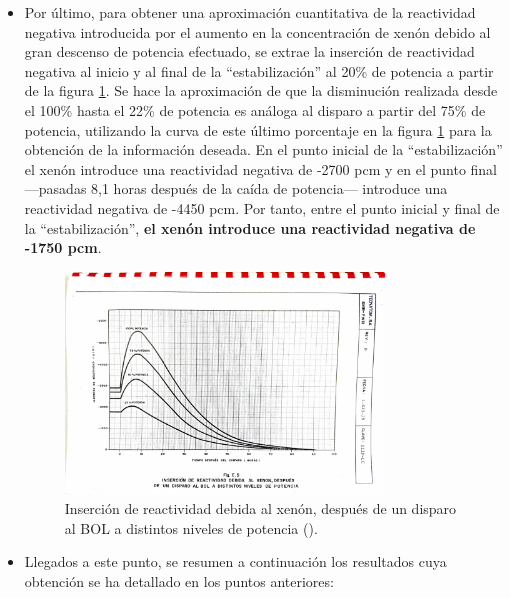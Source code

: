 \begin{itemize}
  \item Por último, para obtener una aproximación cuantitativa de la reactividad negativa introducida por el aumento en la concentración de xenón debido al gran descenso de potencia efectuado, se extrae la inserción de reactividad negativa al inicio y al final de la ``estabilización'' al 20\% de potencia a partir de la figura \ref{fig:reactividad_xenon_disparo}. Se hace la aproximación de que la disminución realizada desde el 100\% hasta el 22\% de potencia es análoga al disparo a partir del 75\% de potencia, utilizando la curva de este último porcentaje en la figura \ref{fig:reactividad_xenon_disparo} para la obtención de la información deseada. En el punto inicial de la ``estabilización'' el xenón introduce una reactividad negativa de -2700 pcm y en el punto final ---pasadas 8,1 horas después de la caída de potencia--- introduce una reactividad negativa de -4450 pcm. Por tanto, entre el punto inicial y final de la ``estabilización'', \textbf{el xenón introduce una reactividad negativa de -1750 pcm}.
  
  \begin{figure}[!h]
    \centering
    \includegraphics[width=0.8\textwidth]{content/figures/reactividad_xenon_disparo.pdf}
    \caption{Inserción de reactividad debida al xenón, después de un disparo al BOL a distintos niveles de potencia (\cite{documentacion_sgiz}).}
    \label{fig:reactividad_xenon_disparo}
  \end{figure}

  \item Llegados a este punto, se resumen a continuación los resultados cuya obtención se ha detallado en los puntos anteriores:
  
  

\end{itemize}



